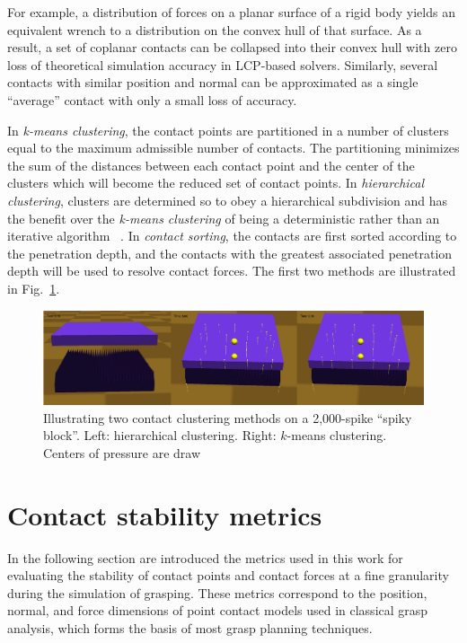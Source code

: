 For example, a distribution of forces on a planar surface of a rigid body yields an equivalent wrench to a distribution on the convex hull of that surface. As a result, a set of coplanar contacts can be collapsed into their convex hull with zero loss of theoretical simulation accuracy in LCP-based solvers.  Similarly, several contacts with similar position and normal can be approximated as a single ``average'' contact with only a small loss of accuracy.

In \emph{k-means clustering}, the contact points are partitioned in a number of clusters equal to the maximum admissible number of contacts. The partitioning minimizes the sum of the distances between each contact point and the center of the clusters which will become the reduced set of contact points.
In \emph{hierarchical clustering}, clusters are determined so to obey a hierarchical subdivision and has the benefit over the \emph{k-means clustering} of being a deterministic rather than an iterative algorithm ~\cite{Rokach10}.
In \emph{contact sorting}, the contacts are first sorted according to the penetration depth, and the contacts with the greatest associated penetration depth will be used to resolve contact forces. The first two methods are illustrated in Fig.~\ref{fig:clustering}.


\begin{figure}[!hbt]
\begin{center}
        \includegraphics[width=0.95\columnwidth]     {images/ssoch/clustering}
        \caption{Illustrating two contact clustering methods on a 2,000-spike ``spiky block''. Left: hierarchical clustering.  Right: $k$-means clustering. Centers of pressure are draw}
        \label{fig:clustering}
        \end{center}
\end{figure}


\section{Contact stability metrics}

In the following section are introduced the metrics used in this work for evaluating the stability of contact points and contact forces at a fine granularity during the simulation of grasping.  These metrics correspond to the position, normal, and force dimensions of point contact models used in classical grasp analysis, which forms the basis of most grasp planning techniques.

